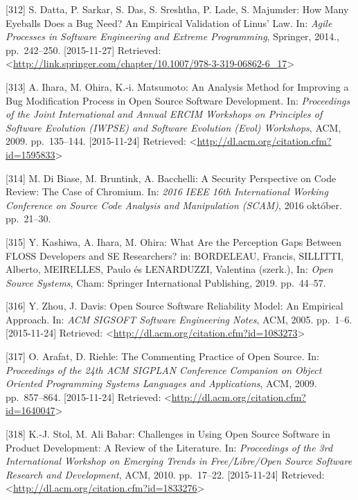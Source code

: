 \documentclass[12pt,magyar,a4paper,oneside]{scrreprt}
\newenvironment{cslreferences}%
  {}%
  {\par}
\begin{document}
\begin{cslreferences}
\leavevmode\hypertarget{ref-datta_how_2014}{}%
{[}312{]} S. Datta, P. Sarkar, S. Das, S. Sreshtha, P. Lade, S.
Majumder: How Many Eyeballs Does a Bug Need? An Empirical Validation of
Linus' Law. In: \emph{Agile Processes in Software Engineering and
Extreme Programming}, Springer, 2014., pp.~242--250. {[}2015-11-27{]}
Retrieved:
\textless{}\url{http://link.springer.com/chapter/10.1007/978-3-319-06862-6_17}\textgreater{}

\leavevmode\hypertarget{ref-ihara_analysis_2009}{}%
{[}313{]} A. Ihara, M. Ohira, K.-i. Matsumoto: An Analysis Method for
Improving a Bug Modification Process in Open Source Software
Development. In: \emph{Proceedings of the Joint International and Annual
ERCIM Workshops on Principles of Software Evolution (IWPSE) and Software
Evolution (Evol) Workshops}, ACM, 2009. pp.~135--144. {[}2015-11-24{]}
Retrieved:
\textless{}\url{http://dl.acm.org/citation.cfm?id=1595833}\textgreater{}

\leavevmode\hypertarget{ref-di_biase_security_2016}{}%
{[}314{]} M. Di Biase, M. Bruntink, A. Bacchelli: A Security Perspective
on Code Review: The Case of Chromium. In: \emph{2016 IEEE 16th
International Working Conference on Source Code Analysis and
Manipulation (SCAM)}, 2016 október. pp.~21--30.

\leavevmode\hypertarget{ref-kashiwa_what_2019}{}%
{[}315{]} Y. Kashiwa, A. Ihara, M. Ohira: What Are the Perception Gaps
Between FLOSS Developers and SE Researchers? in: BORDELEAU, Francis,
SILLITTI, Alberto, MEIRELLES, Paulo és LENARDUZZI, Valentina (szerk.),
In: \emph{Open Source Systems}, Cham: Springer International Publishing,
2019. pp.~44--57.

\leavevmode\hypertarget{ref-zhou_open_2005}{}%
{[}316{]} Y. Zhou, J. Davis: Open Source Software Reliability Model: An
Empirical Approach. In: \emph{ACM SIGSOFT Software Engineering Notes},
ACM, 2005. pp.~1--6. {[}2015-11-24{]} Retrieved:
\textless{}\url{http://dl.acm.org/citation.cfm?id=1083273}\textgreater{}

\leavevmode\hypertarget{ref-arafat_commenting_2009}{}%
{[}317{]} O. Arafat, D. Riehle: The Commenting Practice of Open Source.
In: \emph{Proceedings of the 24th ACM SIGPLAN Conference Companion on
Object Oriented Programming Systems Languages and Applications}, ACM,
2009. pp.~857--864. {[}2015-11-24{]} Retrieved:
\textless{}\url{http://dl.acm.org/citation.cfm?id=1640047}\textgreater{}

\leavevmode\hypertarget{ref-stol_challenges_2010}{}%
{[}318{]} K.-J. Stol, M. Ali Babar: Challenges in Using Open Source
Software in Product Development: A Review of the Literature. In:
\emph{Proceedings of the 3rd International Workshop on Emerging Trends
in Free/Libre/Open Source Software Research and Development}, ACM, 2010.
pp.~17--22. {[}2015-11-24{]} Retrieved:
\textless{}\url{http://dl.acm.org/citation.cfm?id=1833276}\textgreater{}


\end{cslreferences}
\end{document}
